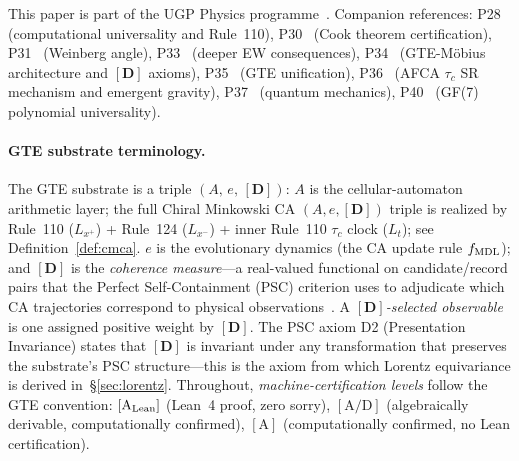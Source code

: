 \documentclass[11pt]{article}
\theoremstyle{remark}
\begin{document}
This paper is part of the UGP Physics programme~\cite{SpivackResearchProgrammes}.  Companion references:
P28~\cite{SpivackCompUniversality} (computational universality and Rule~110),
P30~\cite{SpivackCookTheorem} (Cook theorem certification),
P31~\cite{SpivackWeinbergAngle} (Weinberg angle),
P33~\cite{SpivackDeeperConsequences} (deeper EW consequences),
P34~\cite{SpivackGTEMobius} (GTE-M\"obius architecture and $[\mathbf{D}]$ axioms),
P35~\cite{SpivackGTEUnification} (GTE unification),
P36~\cite{SpivackEmergentGravity} (AFCA $\tau_c$ SR mechanism and emergent gravity),
P37~\cite{SpivackQMFromR110} (quantum mechanics),
P40~\cite{SpivackGF7Universality} (GF(7) polynomial universality).

\paragraph{GTE substrate terminology.}
The GTE substrate is a triple $(A,\,e,\,[\mathbf{D}])$: $A$ is the cellular-automaton arithmetic layer; the full Chiral Minkowski CA $(A,e,[\mathbf{D}])$ triple is realized by Rule~110 ($L_{x^+}$) + Rule~124 ($L_{x^-}$) + inner Rule~110 $\tau_c$ clock ($L_t$); see Definition~\ref{def:cmca}.  $e$ is the evolutionary dynamics (the CA update rule $f_{\rm MDL}$); and $[\mathbf{D}]$ is the \emph{coherence measure}---a real-valued functional on candidate/record pairs that the Perfect Self-Containment (PSC) criterion uses to adjudicate which CA trajectories correspond to physical observations~\cite{SpivackGTEMobius}.  A \emph{$[\mathbf{D}]$-selected observable} is one assigned positive weight by $[\mathbf{D}]$.  The PSC axiom D2 (Presentation Invariance) states that $[\mathbf{D}]$ is invariant under any transformation that preserves the substrate's PSC structure---this is the axiom from which Lorentz equivariance is derived in~\S\ref{sec:lorentz}.  Throughout, \emph{machine-certification levels} follow the GTE convention: $[\mathrm{A}_{\rm Lean}]$ (Lean~4 proof, zero sorry), $[\mathrm{A/D}]$ (algebraically derivable, computationally confirmed), $[\mathrm{A}]$ (computationally confirmed, no Lean certification).
\end{document}
